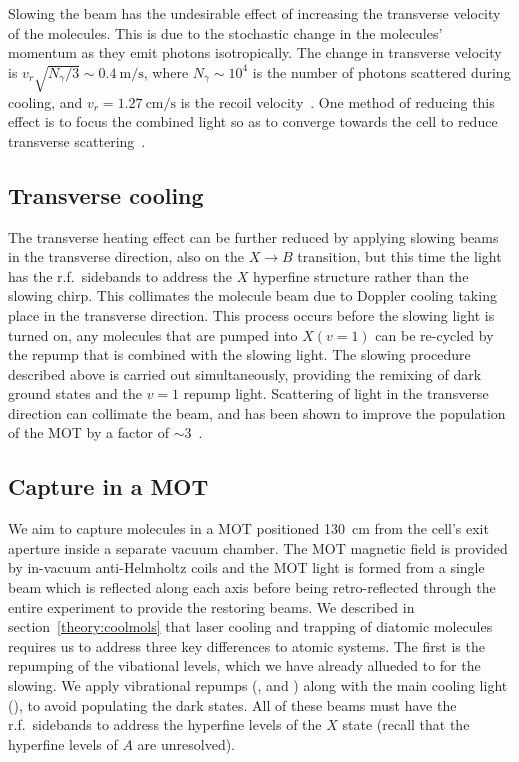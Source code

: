 Slowing the beam has the undesirable effect of increasing the transverse
velocity of the molecules. This is due to the stochastic change in the
molecules' momentum as they emit photons isotropically. The change in
transverse velocity is $v_r\sqrt{N_\gamma/3}\sim\SI{0.4}{\meter\per\second}$,
where $N_\gamma \sim 10^4$ is the number of photons scattered during cooling,
and $v_r=\SI{1.27}{\centi\meter\per\second}$ is the recoil
velocity~\cite{Jurgilas2021}.  One method of reducing this effect is to focus
the combined light so as to converge towards the cell to reduce transverse
scattering~\cite{Truppe2017a}.

\subsection{Transverse cooling}

The transverse heating effect can be further reduced by applying slowing beams
in the transverse direction, also on the $X\rightarrow B$ transition, but this
time the light has the r.f.\ sidebands to address the $X$ hyperfine structure
rather than the slowing chirp. This collimates the molecule beam due to Doppler
cooling taking place in the transverse direction. This process occurs before
the slowing light is turned on, any molecules that are pumped into $X(v=1)$ can
be re-cycled by the  repump that is combined with the slowing
light. The slowing procedure described above is carried out simultaneously,
providing the remixing of dark ground states and the $v=1$ repump light.
%
Scattering of light in the transverse direction can collimate the beam, and has
been shown to improve the population of the MOT by a factor of
$\sim3$~\cite{Jurgilas2021}.

\subsection{Capture in a MOT}
\label{overview:MOT}

We aim to capture molecules in a MOT positioned \SI{130}{\centi\meter} from the
cell's exit aperture inside a separate vacuum chamber. The MOT magnetic field
is provided by in-vacuum anti-Helmholtz coils and the MOT light is formed from
a single beam which is reflected along each axis before being retro-reflected
through the entire experiment to provide the restoring beams.
%
We described in section~\ref{theory:coolmols} that laser cooling and trapping of diatomic
molecules requires us to address three key differences to atomic systems. The
first is the repumping of the vibational levels, which we have already allueded
to for the slowing. We apply vibrational repumps (, 
and ) along with the main cooling light (), to avoid
populating the dark states.  All of these beams must have the r.f.\ sidebands
to address the hyperfine levels of the $X$ state (recall that the hyperfine
levels of $A$ are unresolved).

